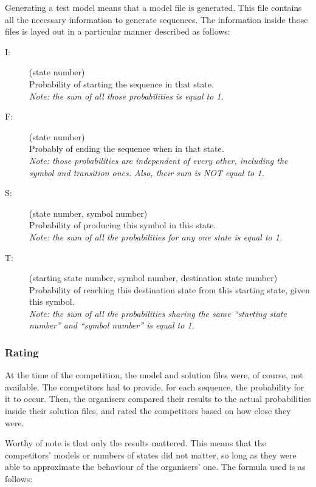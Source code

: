 \enskip{}\enskip{}\enskip{}Generating a test model means that a
model file is generated. This file contains all the necessary information
to generate sequences. The information inside those files is layed
out in a particular manner described as follows:
\begin{description}
\item [{I:}] (state number)\\
Probability of starting the sequence in that state.\\
\textit{Note: the sum of all those probabilities is equal to 1.}
\item [{F:}] (state number)\\
Probably of ending the sequence when in that state\textit{.}\\
\textit{Note: those probabilities are independent of every other,
including the symbol and transition ones. Also, their sum is NOT equal
to 1.}
\item [{S:}] (state number, symbol number)\\
Probability of producing this symbol in this state.\\
\textit{Note: the sum of all the probabilities for any one state is
equal to 1.}
\item [{T:}] (starting state number, symbol number, destination state number)\\
Probability of reaching this destination state from this starting
state, given this symbol.\\
\textit{Note: the sum of all the probabilities sharing the same ``starting
state number'' and ``symbol number'' is equal to 1.}
\end{description}

\subsubsection{Rating}

\enskip{}\enskip{}\enskip{}At the time of the competition, the
model and solution files were, of course, not available. The competitors
had to provide, for each sequence, the probability for it to occur.
Then, the organisers compared their results to the actual probabilities
inside their solution files, and rated the competitors based on how
close they were.

Worthy of note is that only the results mattered. This means that
the competitors\textquoteright{} models or numbers of states did not
matter, so long as they were able to approximate the behaviour of
the organisers\textquoteright{} one. The formula used is as follows:

